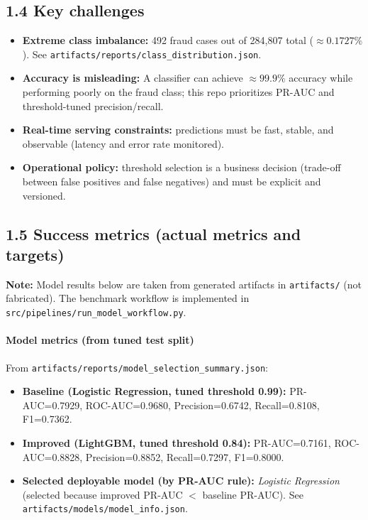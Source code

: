 \documentclass[11pt]{article}
\newcommand{\code}[1]{\texttt{#1}}
\begin{document}
\subsection*{1.4 Key challenges}
\begin{itemize}
  \item \textbf{Extreme class imbalance:} 492 fraud cases out of 284{,}807 total (\(\approx 0.1727\%\)). See \code{artifacts/reports/class_distribution.json}.
  \item \textbf{Accuracy is misleading:} A classifier can achieve \(\approx 99.9\%\) accuracy while performing poorly on the fraud class; this repo prioritizes PR-AUC and threshold-tuned precision/recall.
  \item \textbf{Real-time serving constraints:} predictions must be fast, stable, and observable (latency and error rate monitored).
  \item \textbf{Operational policy:} threshold selection is a business decision (trade-off between false positives and false negatives) and must be explicit and versioned.
\end{itemize}

\subsection*{1.5 Success metrics (actual metrics and targets)}
\textbf{Note:} Model results below are taken from generated artifacts in \code{artifacts/} (not fabricated). The benchmark workflow is implemented in \code{src/pipelines/run_model_workflow.py}.

\paragraph{Model metrics (from tuned test split)}
From \code{artifacts/reports/model_selection_summary.json}:
\begin{itemize}
  \item \textbf{Baseline (Logistic Regression, tuned threshold 0.99):}
    PR-AUC=0.7929, ROC-AUC=0.9680, Precision=0.6742, Recall=0.8108, F1=0.7362.
  \item \textbf{Improved (LightGBM, tuned threshold 0.84):}
    PR-AUC=0.7161, ROC-AUC=0.8828, Precision=0.8852, Recall=0.7297, F1=0.8000.
  \item \textbf{Selected deployable model (by PR-AUC rule):} \emph{Logistic Regression} (selected because improved PR-AUC \(<\) baseline PR-AUC). See \code{artifacts/models/model_info.json}.
\end{itemize}
\end{document}
